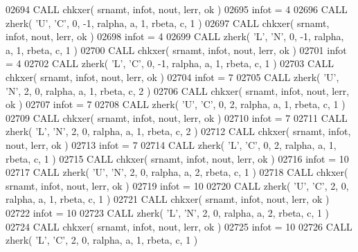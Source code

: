 \begin{DoxyCode}
02694       \textcolor{keyword}{CALL }chkxer( srnamt, infot, nout, lerr, ok )
02695       infot = 4
02696       \textcolor{keyword}{CALL }zherk( \textcolor{stringliteral}{'U'}, \textcolor{stringliteral}{'C'}, 0, -1, ralpha, a, 1, rbeta, c, 1 )
02697       \textcolor{keyword}{CALL }chkxer( srnamt, infot, nout, lerr, ok )
02698       infot = 4
02699       \textcolor{keyword}{CALL }zherk( \textcolor{stringliteral}{'L'}, \textcolor{stringliteral}{'N'}, 0, -1, ralpha, a, 1, rbeta, c, 1 )
02700       \textcolor{keyword}{CALL }chkxer( srnamt, infot, nout, lerr, ok )
02701       infot = 4
02702       \textcolor{keyword}{CALL }zherk( \textcolor{stringliteral}{'L'}, \textcolor{stringliteral}{'C'}, 0, -1, ralpha, a, 1, rbeta, c, 1 )
02703       \textcolor{keyword}{CALL }chkxer( srnamt, infot, nout, lerr, ok )
02704       infot = 7
02705       \textcolor{keyword}{CALL }zherk( \textcolor{stringliteral}{'U'}, \textcolor{stringliteral}{'N'}, 2, 0, ralpha, a, 1, rbeta, c, 2 )
02706       \textcolor{keyword}{CALL }chkxer( srnamt, infot, nout, lerr, ok )
02707       infot = 7
02708       \textcolor{keyword}{CALL }zherk( \textcolor{stringliteral}{'U'}, \textcolor{stringliteral}{'C'}, 0, 2, ralpha, a, 1, rbeta, c, 1 )
02709       \textcolor{keyword}{CALL }chkxer( srnamt, infot, nout, lerr, ok )
02710       infot = 7
02711       \textcolor{keyword}{CALL }zherk( \textcolor{stringliteral}{'L'}, \textcolor{stringliteral}{'N'}, 2, 0, ralpha, a, 1, rbeta, c, 2 )
02712       \textcolor{keyword}{CALL }chkxer( srnamt, infot, nout, lerr, ok )
02713       infot = 7
02714       \textcolor{keyword}{CALL }zherk( \textcolor{stringliteral}{'L'}, \textcolor{stringliteral}{'C'}, 0, 2, ralpha, a, 1, rbeta, c, 1 )
02715       \textcolor{keyword}{CALL }chkxer( srnamt, infot, nout, lerr, ok )
02716       infot = 10
02717       \textcolor{keyword}{CALL }zherk( \textcolor{stringliteral}{'U'}, \textcolor{stringliteral}{'N'}, 2, 0, ralpha, a, 2, rbeta, c, 1 )
02718       \textcolor{keyword}{CALL }chkxer( srnamt, infot, nout, lerr, ok )
02719       infot = 10
02720       \textcolor{keyword}{CALL }zherk( \textcolor{stringliteral}{'U'}, \textcolor{stringliteral}{'C'}, 2, 0, ralpha, a, 1, rbeta, c, 1 )
02721       \textcolor{keyword}{CALL }chkxer( srnamt, infot, nout, lerr, ok )
02722       infot = 10
02723       \textcolor{keyword}{CALL }zherk( \textcolor{stringliteral}{'L'}, \textcolor{stringliteral}{'N'}, 2, 0, ralpha, a, 2, rbeta, c, 1 )
02724       \textcolor{keyword}{CALL }chkxer( srnamt, infot, nout, lerr, ok )
02725       infot = 10
02726       \textcolor{keyword}{CALL }zherk( \textcolor{stringliteral}{'L'}, \textcolor{stringliteral}{'C'}, 2, 0, ralpha, a, 1, rbeta, c, 1 )

\end{DoxyCode}
